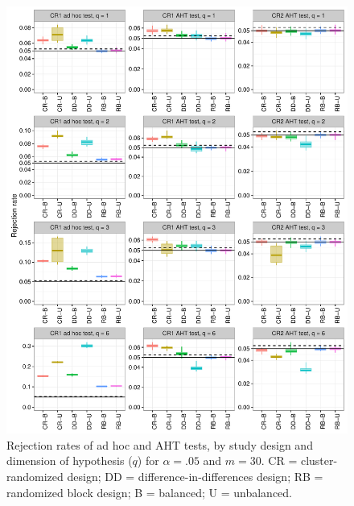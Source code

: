 \documentclass{article}\usepackage[]{graphicx}\usepackage[]{color}
\newenvironment{knitrout}{}{} %
\begin{document}
\begin{knitrout}
\color{fgcolor}\begin{figure}[H]

{\centering \includegraphics[width=\linewidth]{CR_fig/balance_05_30-1} 

}

\caption[Rejection rates of ad hoc and AHT tests, by study design and dimension of hypothesis (]{Rejection rates of ad hoc and AHT tests, by study design and dimension of hypothesis ($q$) for $\alpha = .05$ and $m = 30$. CR = cluster-randomized design; DD = difference-in-differences design; RB = randomized block design; B = balanced; U = unbalanced.}\label{fig:balance_05_30}
\end{figure}


\end{knitrout}
\end{document}

